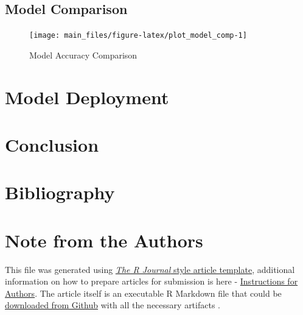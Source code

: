 \hypertarget{model-comparison}{%
\subsection{Model Comparison}\label{model-comparison}}

\begin{Schunk}
\begin{figure}[H]

{\centering \texttt{[image: main\_files/figure-latex/plot\_model\_comp-1]} 

}

\caption[Model Accuracy Comparison]{Model Accuracy Comparison}\label{fig:plot_model_comp}
\end{figure}
\end{Schunk}

\hypertarget{model-deployment}{%
\section{Model Deployment}\label{model-deployment}}

\hypertarget{conclusion}{%
\section{Conclusion}\label{conclusion}}

\hypertarget{bibliography}{%
\section{Bibliography}\label{bibliography}}

\newpage

\hypertarget{note-from-the-authors}{%
\section{Note from the Authors}\label{note-from-the-authors}}

This file was generated using
\href{https://github.com/rstudio/rticles}{\emph{The R Journal} style
article template}, additional information on how to prepare articles for
submission is here -
\href{https://journal.r-project.org/share/author-guide.pdf}{Instructions
for Authors}. The article itself is an executable R Markdown file that
could be
\href{https://github.com/ivbsoftware/big-data-final-2/blob/master/docs/R_Journal/big-data-final-2/}{downloaded
from Github} with all the necessary artifacts
\citep{ivbsoftware_big-data-final}.


